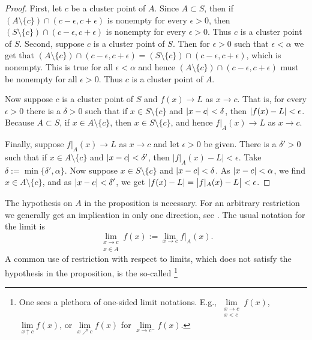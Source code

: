 \begin{proof}
First, let $c$ be a cluster point of $A$.
Since $A \subset S$, then if $( A \setminus \{ c\} ) \cap
(c-\epsilon,c+\epsilon)$ is nonempty for every $\epsilon > 0$,
then $( S \setminus \{ c\} ) \cap
(c-\epsilon,c+\epsilon)$ is nonempty for every $\epsilon > 0$.
Thus $c$ is a cluster point of $S$.
Second, suppose $c$ is a cluster
point of $S$.  Then for $\epsilon > 0$ such that $\epsilon < \alpha$
we get that $( A \setminus \{ c\} ) \cap (c-\epsilon,c+\epsilon) =
( S \setminus \{ c\} ) \cap (c-\epsilon,c+\epsilon)$, which is nonempty.  This is true for all
$\epsilon < \alpha$ and hence 
$( A \setminus \{ c\} ) \cap (c-\epsilon,c+\epsilon)$ must be nonempty for all
$\epsilon > 0$.  Thus $c$ is a cluster point of $A$.

Now suppose $c$ is a cluster point of $S$ and $f(x) \to L$ as $x \to c$.  That is, for every $\epsilon > 0$
there is a $\delta > 0$ such that if $x \in S \setminus \{ c \}$
and $\left\lvert {x-c} \right\rvert < \delta$, then $\left\lvert {f(x)-L} \right\rvert < \epsilon$.  Because $A \subset S$,
if $x \in A \setminus \{ c \}$, then $x \in S \setminus \{ c \}$,
and hence $f|_A(x) \to L$ as $x \to c$.

Finally, suppose $f|_A(x) \to L$ as $x \to c$ and let $\epsilon > 0$ be
given.
There is a $\delta' > 0$ such that if $x \in A \setminus \{ c \}$
and $\left\lvert {x-c} \right\rvert < \delta'$, then $\bigl\lvert f|_A(x)-L \bigr\rvert < \epsilon$.
Take $\delta := \min \{ \delta', \alpha \}$.
Now suppose $x \in S \setminus \{ c \}$ and
$\left\lvert {x-c} \right\rvert < \delta$.  As $\left\lvert {x-c} \right\rvert < \alpha$, we find $x \in A \setminus \{ c \}$,
and as $\left\lvert {x-c} \right\rvert < \delta'$, 
we get $\left\lvert {f(x)-L} \right\rvert = \bigl\lvert f|_A(x)-L
\bigr\rvert < \epsilon$.
\end{proof}

The hypothesis on $A$ in the proposition is necessary.  For an arbitrary
restriction we generally get an implication in only one direction,
see .  
The usual notation for the limit is
\begin{equation*}
\lim_{\substack{x \to c\\x \in A}} f(x) := \lim_{x \to c} f|_A(x) .
\end{equation*}
A common use of restriction with respect to limits, which does not satisfy
the hypothesis in the proposition, is the so-called
\emph{}%
\footnote{%
One sees a plethora of one-sided limit notations.
E.g.,
$\lim\limits_{\substack{x \to c\\x < c}} f(x)$,
$\lim\limits_{x \uparrow c} f(x)$, or
$\lim\limits_{x \nearrow c} f(x)$ for
$\lim\limits_{x \to c^-} f(x)$.}

